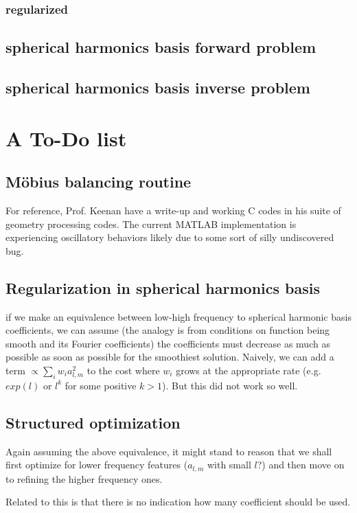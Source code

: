 \documentclass[11pt]{article}
\theoremstyle{definition}
\begin{document}
\subsubsection{regularized}

\subsection{spherical harmonics basis forward problem}

\subsection{spherical harmonics basis inverse problem}

\section{A To-Do list}
\subsection{M\"obius balancing routine}
For reference, Prof. Keenan have a write-up and working C codes in his suite of geometry processing codes.
The current MATLAB implementation is experiencing oscillatory behaviors likely due to some sort of silly undiscovered bug.

\subsection{Regularization in spherical harmonics basis}
if we make an equivalence between low-high frequency to spherical harmonic basis coefficients, we can assume (the analogy is from conditions on function being smooth and its Fourier coefficients) the coefficients must decrease as much as possible as soon as possible for the smoothiest solution.
Naively, we can add a term $\propto \sum_i w_i a_{l,m}^2$ to the cost where $w_i$ grows at the appropriate rate (e.g. $exp(l)$ or $l^k$ for some positive $k>1$). But this did not work so well.

\subsection{Structured optimization}
Again assuming the above equivalence, it might stand to reason that we shall first optimize for lower frequency features ($a_{l,m}$ with small $l$?) and then move on to refining the higher frequency ones.

Related to this is that there is no indication how many coefficient should be used.
\end{document}
